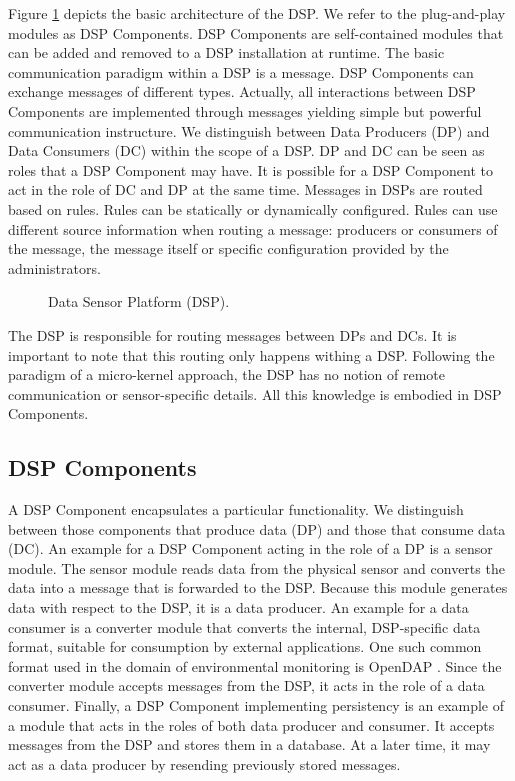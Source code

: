 \documentclass[conference]{IEEEtran}
\begin{document}
Figure \ref{FIG_DSP} depicts the basic architecture of the
DSP. We refer to the plug-and-play modules as DSP Components. DSP
Components are self-contained modules that can be added and removed to
a DSP installation at runtime. The basic communication paradigm within
a DSP is a message. DSP Components can exchange messages of different
types. Actually, all interactions between DSP Components are implemented
through messages yielding simple but powerful communication instructure.
We distinguish between Data Producers (DP) and Data Consumers
(DC) within the scope of a DSP. DP and DC can be seen as roles that a
DSP Component may have. It is possible for a DSP Component to act in
the role of DC and DP at the same time. Messages in DSPs are routed based 
on rules. Rules can be statically or dynamically configured. Rules can use 
different source information when routing a message: producers or consumers of the message, 
the message itself or specific configuration provided by the administrators.

\begin{figure}
\centering
{}
\caption{\label{FIG_DSP} Data Sensor Platform (DSP).}
\end{figure}

The DSP is responsible for routing messages between DPs and DCs. It is
important to note that this routing only happens withing a
DSP. Following the paradigm of a micro-kernel approach, the DSP has no
notion of remote communication or sensor-specific details. All this
knowledge is embodied in DSP Components.

\subsection{DSP Components}

A DSP Component encapsulates a particular functionality. We
distinguish between those components that produce data (DP) and those
that consume data (DC). An example for a DSP Component acting in the
role of a DP is a sensor module. The sensor module reads data from the
physical sensor and converts the data into a message that is forwarded
to the DSP. Because this module generates data with respect to the
DSP, it is a data producer. An example for a data consumer is a
converter module that converts the internal, DSP-specific data format,
suitable for consumption by external applications. One such common
format used in the domain of environmental monitoring is OpenDAP
\cite{opendap01}. Since the converter module accepts messages from the DSP, it
acts in the role of a data consumer. Finally, a DSP Component
implementing persistency is an example of a module that acts in the
roles of both data producer and consumer. It accepts messages from the
DSP and stores them in a database. At a later time, it may act as a
data producer by resending previously stored messages.
\end{document}
